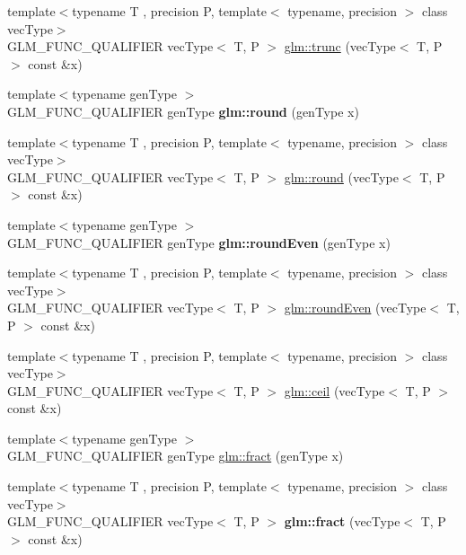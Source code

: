 \begin{DoxyCompactItemize}
\item 
{\footnotesize template$<$typename T , precision P, template$<$ typename, precision $>$ class vec\-Type$>$ }\\G\-L\-M\-\_\-\-F\-U\-N\-C\-\_\-\-Q\-U\-A\-L\-I\-F\-I\-E\-R vec\-Type$<$ T, P $>$ \hyperlink{group__core__func__common_ga634cdbf8b37edca03f2248450570fd54}{glm\-::trunc} (vec\-Type$<$ T, P $>$ const \&x)
\item 
\hypertarget{namespaceglm_a63066719f14195375ae55b9770460301}{{\footnotesize template$<$typename gen\-Type $>$ }\\G\-L\-M\-\_\-\-F\-U\-N\-C\-\_\-\-Q\-U\-A\-L\-I\-F\-I\-E\-R gen\-Type {\bfseries glm\-::round} (gen\-Type x)}\label{namespaceglm_a63066719f14195375ae55b9770460301}

\item 
{\footnotesize template$<$typename T , precision P, template$<$ typename, precision $>$ class vec\-Type$>$ }\\G\-L\-M\-\_\-\-F\-U\-N\-C\-\_\-\-Q\-U\-A\-L\-I\-F\-I\-E\-R vec\-Type$<$ T, P $>$ \hyperlink{group__core__func__common_gada0165544c0618d634c8056a88082ce9}{glm\-::round} (vec\-Type$<$ T, P $>$ const \&x)
\item 
\hypertarget{namespaceglm_ae02684863360f29d6e9fb9b5ad4ab5d9}{{\footnotesize template$<$typename gen\-Type $>$ }\\G\-L\-M\-\_\-\-F\-U\-N\-C\-\_\-\-Q\-U\-A\-L\-I\-F\-I\-E\-R gen\-Type {\bfseries glm\-::round\-Even} (gen\-Type x)}\label{namespaceglm_ae02684863360f29d6e9fb9b5ad4ab5d9}

\item 
{\footnotesize template$<$typename T , precision P, template$<$ typename, precision $>$ class vec\-Type$>$ }\\G\-L\-M\-\_\-\-F\-U\-N\-C\-\_\-\-Q\-U\-A\-L\-I\-F\-I\-E\-R vec\-Type$<$ T, P $>$ \hyperlink{group__core__func__common_ga655598104195a60a950291485e84a97e}{glm\-::round\-Even} (vec\-Type$<$ T, P $>$ const \&x)
\item 
{\footnotesize template$<$typename T , precision P, template$<$ typename, precision $>$ class vec\-Type$>$ }\\G\-L\-M\-\_\-\-F\-U\-N\-C\-\_\-\-Q\-U\-A\-L\-I\-F\-I\-E\-R vec\-Type$<$ T, P $>$ \hyperlink{group__core__func__common_ga9189b2bec45ff301923ea8f8dd157fb8}{glm\-::ceil} (vec\-Type$<$ T, P $>$ const \&x)
\item 
{\footnotesize template$<$typename gen\-Type $>$ }\\G\-L\-M\-\_\-\-F\-U\-N\-C\-\_\-\-Q\-U\-A\-L\-I\-F\-I\-E\-R gen\-Type \hyperlink{group__core__func__common_ga8ba89e40e55ae5cdf228548f9b7639c7}{glm\-::fract} (gen\-Type x)
\item 
\hypertarget{group__core__func__common_ga950ab967a4406f596b7c6c14af091874}{{\footnotesize template$<$typename T , precision P, template$<$ typename, precision $>$ class vec\-Type$>$ }\\G\-L\-M\-\_\-\-F\-U\-N\-C\-\_\-\-Q\-U\-A\-L\-I\-F\-I\-E\-R vec\-Type$<$ T, P $>$ {\bfseries glm\-::fract} (vec\-Type$<$ T, P $>$ const \&x)}\label{group__core__func__common_ga950ab967a4406f596b7c6c14af091874}


\end{DoxyCompactItemize}
